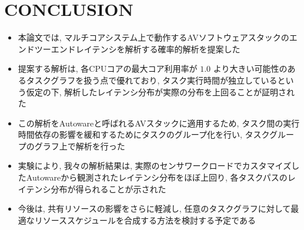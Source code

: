 
\section{CONCLUSION}
\label{sec: conclusion}

\begin{frame}{}
    \begin{itemize}
        \item 本論文では, マルチコアシステム上で動作するAVソフトウェアスタックのエンドツーエンドレイテンシを解析する確率的解析を提案した
\item 提案する解析は, 各CPUコアの最大コア利用率が $1.0$ より大きい可能性のあるタスクグラフを扱う点で優れており, タスク実行時間が独立しているという仮定の下, 解析したレイテンシ分布が実際の分布を上回ることが証明された
    \end{itemize}
\end{frame}

\begin{frame}{}
    \begin{itemize}
        \item この解析をAutowareと呼ばれるAVスタックに適用するため, タスク間の実行時間依存の影響を緩和するためにタスクのグループ化を行い, タスクグループのグラフ上で解析を行った
\item 実験により, 我々の解析結果は, 実際のセンサワークロードでカスタマイズしたAutowareから観測されたレイテンシ分布をほぼ上回り, 各タスクパスのレイテンシ分布が得られることが示された
\item 今後は, 共有リソースの影響をさらに軽減し, 任意のタスクグラフに対して最適なリソーススケジュールを合成する方法を検討する予定である
    \end{itemize}
\end{frame}
